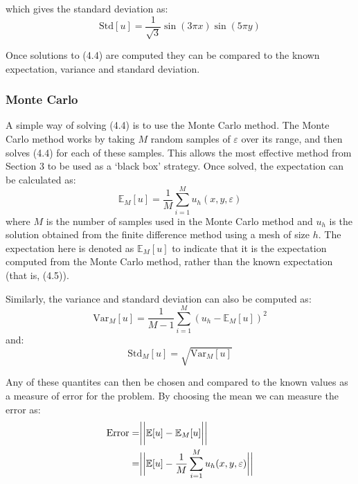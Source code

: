 \documentclass{article}
\numberwithin{equation}{section}
\begin{document}
which gives the standard deviation as:
\begin{equation}
\text{Std}[u] = \frac{1}{\sqrt{3}} \sin(3 \pi x) \sin(5 \pi y)
\end{equation}

Once solutions to (4.4) are computed they can be compared to the known expectation, variance and standard deviation.

\subsubsection{Monte Carlo}
A simple way of solving (4.4) is to use the Monte Carlo method. The Monte Carlo method works by taking $M$ random samples of $\varepsilon$ over its range, and then solves (4.4) for each of these samples. 
This allows the most effective method from Section 3 to be used as a `black box' strategy. Once solved, the expectation can be calculated as:
\begin{equation}
\mathbb{E}_M[u] = \frac{1}{M} \sum_{i=1}^M u_h (x, y, \varepsilon)
\end{equation}
where $M$ is the number of samples used in the Monte Carlo method and $u_h$ is the solution obtained from the finite difference method using a mesh of size $h$. The expectation here is denoted as $\mathbb{E}_M[u]$ to indicate that it is the expectation computed from the Monte Carlo method, rather than the known expectation (that is, (4.5)). 

Similarly, the variance and standard deviation can also be computed as:
\begin{equation}
\text{Var}_M[u] = \frac{1}{M-1}\sum_{i=1}^M (u_h - \mathbb{E}_M[u])^2
\end{equation}
and:
\begin{equation}
\text{Std}_M[u] = \sqrt{\text{Var}_M[u]}
\end{equation}


Any of these quantites can then be chosen and compared to the known values as a measure of error for the problem. By choosing the mean we can measure the error as:
\begin{equation}
\begin{split}
\text{Error} = & \bigg{|} \bigg{|} \mathbb{E}[u] - \mathbb{E}_M[u] \bigg{|} \bigg{|} \\
= & \bigg{|} \bigg{|} \mathbb{E}[u] - \frac{1}{M} \sum_{i=1}^M u_h (x, y, \varepsilon) \bigg{|}\bigg{|}
\end{split}
\end{equation}
\end{document}
